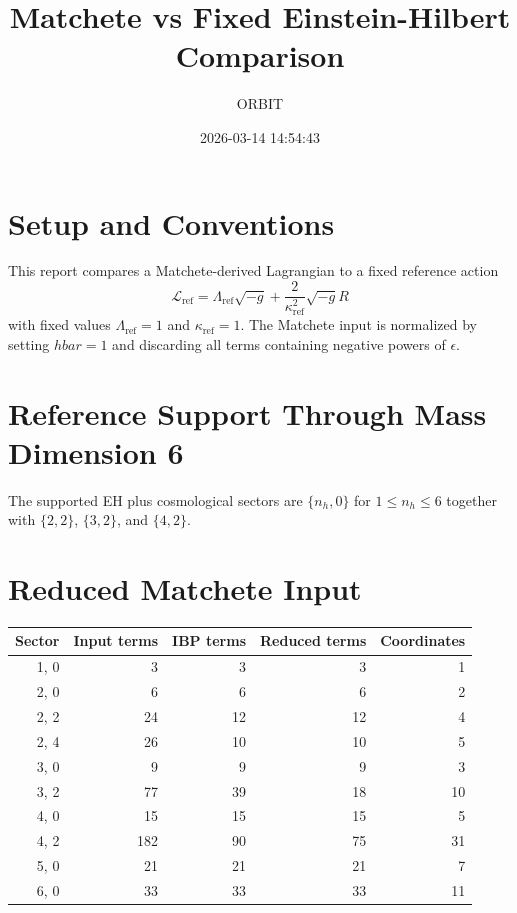 \documentclass[11pt]{article}
\title{Matchete vs Fixed Einstein-Hilbert Comparison}
\author{ORBIT}
\date{2026-03-14 14:54:43}
\begin{document}
\maketitle
\tableofcontents
\section{Setup and Conventions}
This report compares a Matchete-derived Lagrangian to a fixed reference action
\begin{equation}
\mathcal{L}_{\mathrm{ref}} = \Lambda_{\mathrm{ref}} \sqrt{-g} + \frac{2}{\kappa_{\mathrm{ref}}^2} \sqrt{-g} R
\end{equation}
with fixed values $\Lambda_{\mathrm{ref}} = 1$ and $\kappa_{\mathrm{ref}} = 1$.
The Matchete input is normalized by setting $hbar = 1$ and discarding all terms containing negative powers of $\epsilon$.
\section{Reference Support Through Mass Dimension 6}
The supported EH plus cosmological sectors are $\{n_h, 0\}$ for $1 \le n_h \le 6$ together with $\{2,2\}$, $\{3,2\}$, and $\{4,2\}$.
\section{Reduced Matchete Input}
\begin{longtable}{rrrrr}
\toprule
Sector & Input terms & IBP terms & Reduced terms & Coordinates \\
\midrule
{1, 0} & 3 & 3 & 3 & 1 \\
{2, 0} & 6 & 6 & 6 & 2 \\
{2, 2} & 24 & 12 & 12 & 4 \\
{2, 4} & 26 & 10 & 10 & 5 \\
{3, 0} & 9 & 9 & 9 & 3 \\
{3, 2} & 77 & 39 & 18 & 10 \\
{4, 0} & 15 & 15 & 15 & 5 \\
{4, 2} & 182 & 90 & 75 & 31 \\
{5, 0} & 21 & 21 & 21 & 7 \\
{6, 0} & 33 & 33 & 33 & 11 \\
\bottomrule
\end{longtable}
\end{document}

